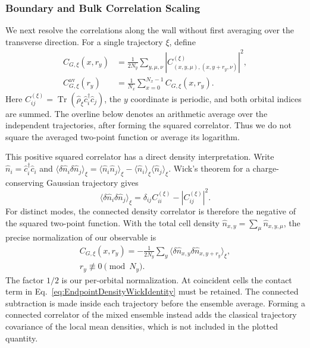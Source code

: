 \subsubsection{Boundary and Bulk Correlation Scaling}
We next resolve the correlations along the wall without first averaging over
the transverse direction.  For a single trajectory $\xi$, define
\begin{align}
 C_{G,\xi}(x,r_y)
 &=\frac{1}{2N_y}\sum_{y,\mu,\nu}
 \left|C^{(\xi)}_{(x,y,\mu),(x,y+r_y,\nu)}\right|^2,
 \nonumber\\
 C_{G,\xi}^{\mathrm{av}}(r_y)
 &=\frac{1}{N_x}\sum_{x=0}^{N_x-1}C_{G,\xi}(x,r_y).
 \label{eq:EndpointSquaredCorrelator}
\end{align}
Here $C^{(\xi)}_{ij}=\operatorname{Tr}(\hat\rho_\xi\hat c_i^\dagger\hat c_j)$,
the $y$ coordinate is periodic, and both orbital indices are summed.  The
overline below denotes an arithmetic average over the independent
trajectories, after forming the squared correlator.  Thus we do not square
the averaged two-point function or average its logarithm.

This positive squared correlator has a direct density interpretation.
Write $\hat n_i=\hat c_i^\dagger\hat c_i$ and
$\langle\delta\hat n_i\delta\hat n_j\rangle_\xi
=\langle\hat n_i\hat n_j\rangle_\xi
-\langle\hat n_i\rangle_\xi\langle\hat n_j\rangle_\xi$.
Wick's theorem for a charge-conserving Gaussian trajectory gives
\begin{equation}
 \langle\delta\hat n_i\delta\hat n_j\rangle_\xi
 =\delta_{ij}C^{(\xi)}_{ii}-|C^{(\xi)}_{ij}|^2.
 \label{eq:EndpointDensityWickIdentity}
\end{equation}
For distinct modes, the connected density correlator is therefore the
negative of the squared two-point function.  With the total cell density
$\hat n_{x,y}=\sum_\mu\hat n_{x,y,\mu}$, the precise normalization of
our observable is
\begin{align}
 C_{G,\xi}(x,r_y)=-\frac{1}{2N_y}\sum_y
 \langle\delta\hat n_{x,y}\delta\hat n_{x,y+r_y}\rangle_\xi,
 \nonumber\\[-2pt]
 r_y\not\equiv0\pmod{N_y}.
 \label{eq:EndpointCellDensityCorrelator}
\end{align}
The factor $1/2$ is our per-orbital normalization.  At coincident cells the
contact term in Eq.~\eqref{eq:EndpointDensityWickIdentity} must be retained.
The connected subtraction is made inside each trajectory before the
ensemble average.  Forming a connected correlator of the mixed ensemble
instead adds the classical trajectory covariance of the local mean
densities, which is not included in the plotted quantity.

